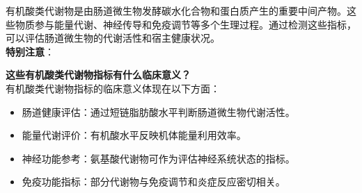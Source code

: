\documentclass[UTF8]{ctexart}
\begin{document}
\vspace{0.05cm}

\begin{tcolorbox}[
    enhanced,
    colback=customTealBg,
    colframe=customTealBg,
    arc=3mm,
    boxrule=0pt,
    width=\textwidth,
    top=8pt,
    bottom=8pt
]
{\small{\color{customTeal}\faInfoCircle} 有机酸类代谢物是由肠道微生物发酵碳水化合物和蛋白质产生的重要中间产物。这些物质参与能量代谢、神经传导和免疫调节等多个生理过程。通过检测这些指标，可以评估肠道微生物的代谢活性和宿主健康状况。\\
{\color{orange}\faExclamationTriangle} \textbf{特别注意}：
}
\end{tcolorbox}

\begin{tcolorbox}[
    enhanced,
    colback=lightpurple!10, %
    colframe=white,  %
    arc=3mm,
    boxrule=0.5pt,
    width=\textwidth,
    top=8pt,
    bottom=8pt
]
{\small{\color{lightpurple}\faQuestionCircle}\quad \textbf{这些有机酸类代谢物指标有什么临床意义？}\\
{\color{orange!50}\faComments}\quad 有机酸类代谢物指标的临床意义体现在以下方面：
\begin{itemize}
    \item 肠道健康评估：通过短链脂肪酸水平判断肠道微生物代谢活性。
    \item 能量代谢评价：有机酸水平反映机体能量利用效率。
    \item 神经功能参考：氨基酸代谢物可作为评估神经系统状态的指标。
    \item 免疫功能指标：部分代谢物与免疫调节和炎症反应密切相关。
\end{itemize}
}
\end{tcolorbox}
\end{document}
